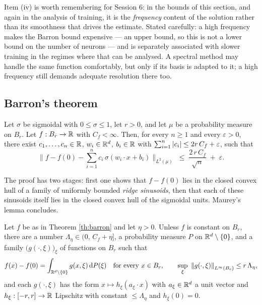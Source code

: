 \documentclass[11pt,a4paper]{article}
\begin{document}
\begin{remark}\label{rem:barron-freq}
Item (iv) is worth remembering for Session 6: in the bounds of this section, and again in the
analysis of training, it is the \emph{frequency} content of the solution rather than its smoothness
that drives the estimate. Stated carefully: a high frequency makes the Barron bound expensive --- an
upper bound, so this is not a lower bound on the number of neurons --- and is separately associated
with slower training in the regimes where that can be analysed. A spectral method may handle the
same function comfortably, but only if its basis is adapted to it; a high frequency still demands
adequate resolution there too.
\end{remark}

\subsection{Barron's theorem}

\begin{theorem}[Barron, 1993]\label{th:barron}
Let $\sigma$ be sigmoidal with $0 \le \sigma \le 1$, let $r > 0$, and let $\mu$ be a probability
measure on $B_r$. Let $f : B_r \to \mathbb{R}$ with $C_f < \infty$. Then, for every $n \ge 1$ and every
$\varepsilon > 0$, there exist $c_1,\dots,c_n \in \mathbb{R}$, $w_i \in \mathbb{R}^d$, $b_i \in \mathbb{R}$ with
$\sum_{i=1}^n \left\lvert c_i \right\rvert \le 2 r\, C_f + \varepsilon$, such that
\[
\Big\| f - f(0) - \sum_{i=1}^n c_i\, \sigma(w_i\cdot x + b_i) \Big\|_{L^2(\mu)}
\;\le\; \frac{2\, r\, C_f}{\sqrt n} \;+\; \varepsilon .
\]
\end{theorem}

The proof has two stages: first one shows that $f - f(0)$ lies in the closed convex hull of a family
of uniformly bounded \emph{ridge sinusoids}, then that each of these sinusoids itself lies in the
closed convex hull of the sigmoidal units. Maurey's lemma concludes.

\begin{lemma}\label{lem:barron-A}
Let $f$ be as in Theorem \ref{th:barron} and let $\eta > 0$. Unless $f$ is constant on $B_r$, there
are a number $\Lambda_\eta \in (0,\, C_f + \eta]$, a probability measure $P$ on
$\mathbb{R}^d \setminus \{0\}$, and a family $\big(g(\cdot,\xi)\big)_\xi$ of functions on $B_r$ such that
\[
f(x) - f(0) = \int_{\mathbb{R}^d\setminus\{0\}} g(x,\xi)\, \mathrm{d} P(\xi)
\quad \text{for every } x \in B_r,
\qquad
\sup_{\xi}\ \left\lVert g(\cdot,\xi) \right\rVert_{L^\infty(B_r)} \le r\, \Lambda_\eta,
\]
and each $g(\cdot,\xi)$ has the form $x \mapsto h_\xi(a_\xi \cdot x)$ with $a_\xi \in \mathbb{R}^d$ a unit
vector and $h_\xi : [-r,r]\to\mathbb{R}$ Lipschitz with constant $\le \Lambda_\eta$ and $h_\xi(0)=0$.
\end{lemma}
\end{document}
